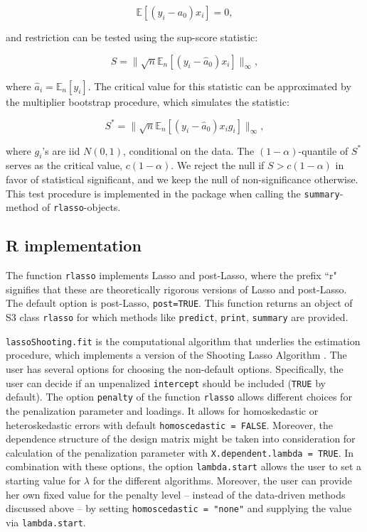 \documentclass{amsart}\usepackage[]{graphicx}\usepackage[]{color}
\newcommand{\code}[1]{\texttt{#1}}
\begin{document}
$$ \mathbb{E} \left[ (y_i - a_0) x_i \right] = 0,$$
 
and restriction can be tested using the sup-score statistic:
 
$$S = \| \sqrt{n} \mathbb{E}_n \left[ (y_i - \hat a_0) x_i \right] \|_\infty,$$

where $\hat a_i =  \mathbb{E}_n [y_i]$.  The critical value for this statistic can be approximated  by the multiplier bootstrap procedure, which simulates the statistic:
 
$$ S^* = \| \sqrt{n} \mathbb{E}_n \left[ (y_i - \hat a_0) x_i g_i \right] \|_\infty,$$
 
where $g_i$'s are iid $N(0,1)$, conditional on the data. The $(1-\alpha)$-quantile of $S^*$ serves as the critical value, $c(1-\alpha)$. We reject the null if $S > c(1-\alpha)$ in favor of statistical significant, and we keep the null of non-significance otherwise. This test procedure is implemented in the package when calling the \texttt{summary}-method of \texttt{rlasso}-objects.


\subsection*{R implementation}  The function \texttt{rlasso} implements Lasso and post-Lasso, where the prefix ``r" signifies that these are theoretically rigorous versions of Lasso and post-Lasso. The default option is post-Lasso, \code{post=TRUE}.  This function returns an object of S3 class \code{rlasso} for which methods like \code{predict}, \code{print}, \code{summary} are provided.

 \code{lassoShooting.fit} is the computational algorithm that underlies the estimation procedure, which implements a version of the Shooting Lasso Algorithm \citep{Fu1998}. The user has several options for choosing the non-default options. Specifically, the user can decide if an unpenalized \code{intercept} should be included (\code{TRUE} by default). The option \code{penalty} of the function \code{rlasso} allows different choices for the penalization parameter and loadings. It allows for homoskedastic or heteroskedastic errors with default \code{homoscedastic = FALSE}. Moreover, the dependence structure of the design matrix might be taken into consideration for calculation of the penalization parameter with \code{X.dependent.lambda = TRUE}. In combination with these options, the option \code{lambda.start} allows the user to set a starting value for $\lambda$ for the different algorithms. Moreover, the user can provide her own fixed value for the penalty level -- instead of the data-driven methods discussed above --  by setting \code{homoscedastic = "none"} and  supplying the value via \code{lambda.start}.
 
\end{document}
